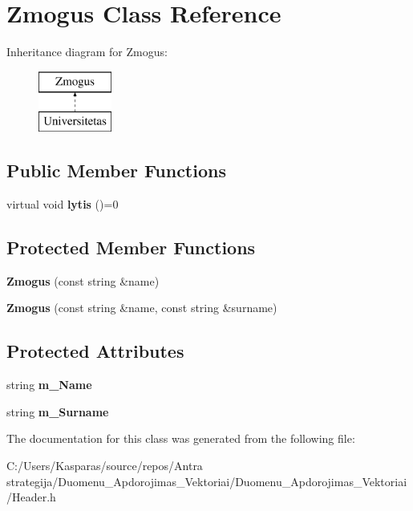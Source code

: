 \hypertarget{class_zmogus}{}\section{Zmogus Class Reference}
\label{class_zmogus}
Inheritance diagram for Zmogus\+:\begin{figure}[H]
\begin{center}
\leavevmode
\includegraphics[height=2.000000cm]{class_zmogus}
\end{center}
\end{figure}
\subsection*{Public Member Functions}
\begin{DoxyCompactItemize}
\item 
\mbox{\label{class_zmogus_a01b04e61e073e3590326d462ad42247e}} 
virtual void {\bfseries lytis} ()=0
\end{DoxyCompactItemize}
\subsection*{Protected Member Functions}
\begin{DoxyCompactItemize}
\item 
\mbox{\label{class_zmogus_a9ed94ed8814d263b7e240a4b85802343}} 
{\bfseries Zmogus} (const string \&name)
\item 
\mbox{\label{class_zmogus_a745bee3bf027c67d6592838d8ebf5002}} 
{\bfseries Zmogus} (const string \&name, const string \&surname)
\end{DoxyCompactItemize}
\subsection*{Protected Attributes}
\begin{DoxyCompactItemize}
\item 
\mbox{\label{class_zmogus_a67f11569fe576ca64d271259b7600370}} 
string {\bfseries m\+\_\+\+Name}
\item 
\mbox{\label{class_zmogus_ab8900783ffde6f36c1d98e4d2f626a01}} 
string {\bfseries m\+\_\+\+Surname}
\end{DoxyCompactItemize}


The documentation for this class was generated from the following file\+:\begin{DoxyCompactItemize}
\item 
C\+:/\+Users/\+Kasparas/source/repos/\+Antra strategija/\+Duomenu\+\_\+\+Apdorojimas\+\_\+\+Vektoriai/\+Duomenu\+\_\+\+Apdorojimas\+\_\+\+Vektoriai/Header.\+h\end{DoxyCompactItemize}
